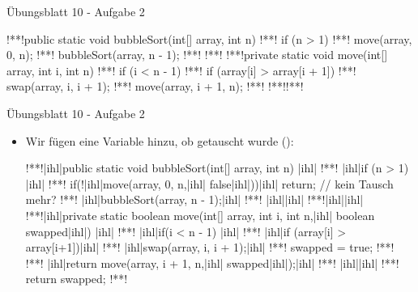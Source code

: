 \begin{frame}[c,fragile]{Übungsblatt 10 - Aufgabe 2}
\begin{plainjava}
!**!public static void bubbleSort(int[] array, int n) {
!**!    if (n > 1) {
!**!        move(array, 0, n);
!**!        bubbleSort(array, n - 1);
!**!    }
!**!}
!**!private static void move(int[] array, int i, int n) {
!**!    if (i < n - 1) {
!**!        if (array[i] > array[i + 1])
!**!            swap(array, i, i + 1);
!**!        move(array, i + 1, n);
!**!    }
!**!}!**!
\end{plainjava}
\end{frame}

\iffull
\begin{frame}[c,fragile]{Übungsblatt 10 - Aufgabe 2}
\SetupLstHl\begin{itemize}[<+(1)->]
    \item Wir fügen eine Variable hinzu, ob getauscht wurde ():
\begin{plainjava}
!**!|ihl|public static void bubbleSort(int[] array, int n) {|ihl|
!**!    |ihl|if (n > 1) {|ihl|
!**!        if(!|ihl|move(array, 0, n,|ihl| false|ihl|))|ihl| return; // kein Tausch mehr?
!**!        |ihl|bubbleSort(array, n - 1);|ihl|
!**!    |ihl|}|ihl|
!**!|ihl|}|ihl|
!**!|ihl|private static boolean move(int[] array, int i, int n,|ihl| boolean swapped|ihl|) {|ihl|
!**!    |ihl|if(i < n - 1) {|ihl|
!**!        |ihl|if (array[i] > array[i+1])|ihl| {
!**!            |ihl|swap(array, i, i + 1);|ihl|
!**!            swapped = true;
!**!        }
!**!        |ihl|return move(array, i + 1, n,|ihl| swapped|ihl|);|ihl|
!**!    |ihl|}|ihl|
!**!    return swapped;
!**!}
\end{plainjava}
\end{itemize}
\end{frame}
\fi

